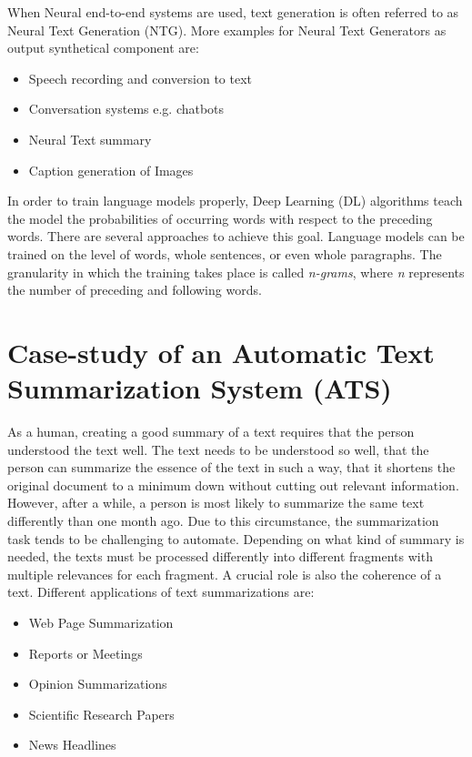 When Neural end-to-end systems are used, text generation is often referred to as Neural Text Generation (NTG). More examples for Neural Text Generators as output synthetical component are:

\begin{itemize}
\item Speech recording and conversion to text
\item Conversation systems e.g. chatbots
\item Neural Text summary
\item Caption generation of Images
\end{itemize} 

In order to train language models properly, Deep Learning (DL) algorithms teach the model the probabilities of occurring words with respect to the preceding words. There are several approaches to achieve this goal. Language models can be trained on the level of words, whole sentences, or even whole paragraphs. The granularity in which the training takes place is called \textit{n-grams}, where \textit{n} represents the number of preceding and following words. 


\section{Case-study of an Automatic Text Summarization System (ATS)}\label{ss:case}

As a human, creating a good summary of a text requires that the person understood the text well. The text needs to be understood so well, that the person can summarize the essence of the text in such a way, that it shortens the original document to a minimum down without cutting out relevant information. However, after a while, a person is most likely to summarize the same text differently than one month ago. Due to this circumstance, the summarization task tends to be challenging to automate. Depending on what kind of summary is needed, the texts must be processed differently into different fragments with multiple relevances for each fragment. A crucial role is also the coherence of a text. Different applications of text summarizations are:

\begin{itemize}
	\item Web Page Summarization
	\item Reports or Meetings
	\item Opinion Summarizations
	\item Scientific Research Papers
	\item News Headlines
\end{itemize}


